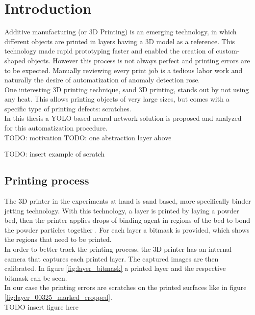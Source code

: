 \section{Introduction}



Additive manufacturing (or 3D Printing) is an emerging technology, in which
different objects are printed in layers having a 3D model as a reference. This technology made rapid prototyping faster and enabled the creation of custom-shaped objects. However this process is not always perfect and printing errors are to be expected. Manually reviewing every print job is a tedious labor work and naturally the desire of automatization of anomaly detection rose. \\
One interesting 3D printing technique, sand 3D printing, stands out by not using any heat. This allows printing objects of very large sizes, but comes with a specific type of printing defects: scratches. \\
In this thesis a YOLO-based neural network solution is proposed and analyzed for this automatization procedure. \\
TODO: motivation
TODO: one abstraction layer above

TODO: insert example of scratch


\subsection{Printing process}
The 3D printer in the experiments at hand is sand based, more specifically binder jetting technology. With this technology, a layer is printed by laying a powder bed, then the printer applies drops of binding agent in regions of the bed to bond the powder particles together \cite{binder_jetting}. For each layer a bitmask is provided, which shows the regions that need to be printed. \\
In order to better track the printing process, the 3D printer has an internal camera that captures each printed layer. The captured images are then calibrated. In figure \ref{fig:layer_bitmask} a printed layer and the respective bitmask can be seen.\\
In our case the printing errors are scratches on the printed surfaces like in figure \ref{fig:layer_00325_marked_cropped}. \\

TODO insert figure here
%
%
%
%


